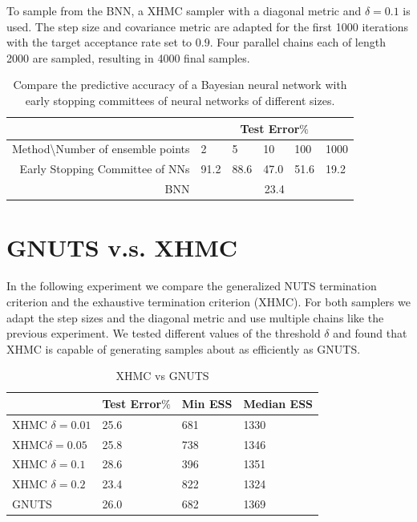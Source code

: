 \documentclass[12pt]{report}
\begin{document}
To sample from the BNN, a XHMC sampler with a diagonal metric and $\delta = 0.1$ is used. The step size and covariance metric are adapted for the first 1000 iterations with the target acceptance rate set to $0.9$. Four parallel chains each of length 2000 are sampled, resulting in 4000 final samples.
\begin{table}[]
\centering
\begin{tabular}{@{}rlllll@{}}
\multicolumn{1}{l}{}                            & \multicolumn{5}{c}{Test Error$\%$} \\ \midrule
Method\textbackslash{}Number of ensemble points & 2    & 5   & 10  & 100 & 1000 \\ \midrule
Early Stopping Committee of NNs                 & 91.2  & 88.6 & 47.0 & 51.6 & 19.2  \\ \midrule
BNN                                             & \multicolumn{5}{c}{23.4}        \\ \bottomrule
\end{tabular}
\caption{Compare the predictive accuracy of a Bayesian neural network with early stopping committees of neural networks of different sizes.}
\label{esc}
\end{table}

\section{GNUTS v.s. XHMC}
In the following experiment we compare the generalized NUTS termination criterion and the exhaustive termination criterion (XHMC). For both samplers we adapt the step sizes and the diagonal metric and use multiple chains like the previous experiment. We tested different values of the threshold $\delta$ and found that XHMC is capable of generating samples about as efficiently as GNUTS. 

\begin{table}[]
\centering
\begin{tabular}{@{}llll@{}}
\toprule
          & Test Error$\%$ & Min ESS & Median ESS \\ \midrule
XHMC $\delta=0.01$  & 25.6       & 681     & 1330       \\ \midrule
XHMC$\delta=0.05$  & 25.8       & 738     & 1346       \\ \midrule
XHMC $\delta=0.1$ & 28.6       & 396     & 1351       \\ \midrule
XHMC $\delta=0.2$ & 23.4       & 822    & 1324        \\ \midrule
GNUTS     & 26.0       & 682     & 1369       \\ \bottomrule
\end{tabular}
\caption{XHMC vs GNUTS}
\label{my-label}
\end{table}
\end{document}
